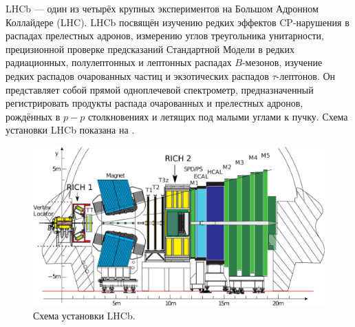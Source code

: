 LHCb --- один из четырёх крупных экспериментов на Большом Адронном Коллайдере (LHC). LHCb посвящён изучению редких эффектов CP-нарушения в распадах прелестных адронов, измерению углов треугольника унитарности, прецизионной проверке предсказаний Стандартной Модели в редких радиационных, полулептонных и лептонных распадах $B$-мезонов, изучение редких распадов очарованных частиц и экзотических распадов $\tau$-лептонов. Он представляет собой прямой одноплечевой спектрометр, предназначенный регистрировать продукты распада очарованных и прелестных адронов, рождённых в $p-p$ столкновениях и летящих под малыми углами к пучку. Схема установки LHCb показана на .


\begin{figure}[H]
\centering
\includegraphics[width=1.0\textwidth]{pictures/LHCb.png}
\caption{Схема установки LHCb.}
\label{fig:LHCb}
\end{figure}






